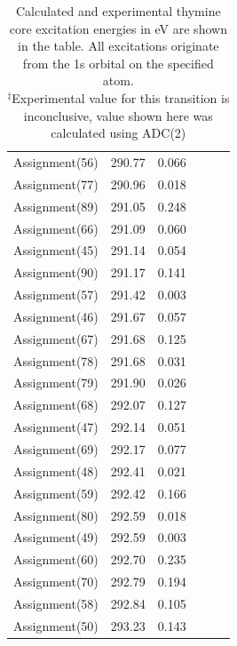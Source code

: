\documentclass[11.5pt]{article}
\begin{document}
\begin{table}
\begin{tabular}{c@{\hskip 0.22in}c@{\hskip 0.22in}c@{\hskip 0.52in}c@{\hskip 0.22in}c@{\hskip 0.22in}c}
 Assignment(56) & 290.77 & 0.066 \\
 Assignment(77) & 290.96 & 0.018 \\
 Assignment(89) & 291.05 & 0.248 \\
 Assignment(66) & 291.09 & 0.060 \\
 Assignment(45) & 291.14 & 0.054 \\
 Assignment(90) & 291.17 & 0.141 \\
 Assignment(57) & 291.42 & 0.003 \\
 Assignment(46) & 291.67 & 0.057 \\
 Assignment(67) & 291.68 & 0.125 \\
 Assignment(78) & 291.68 & 0.031 \\
 Assignment(79) & 291.90 & 0.026 \\
 Assignment(68) & 292.07 & 0.127 \\
 Assignment(47) & 292.14 & 0.051 \\
 Assignment(69) & 292.17 & 0.077 \\
 Assignment(48) & 292.41 & 0.021 \\
 Assignment(59) & 292.42 & 0.166 \\
 Assignment(80) & 292.59 & 0.018 \\
 Assignment(49) & 292.59 & 0.003 \\
 Assignment(60) & 292.70 & 0.235 \\
 Assignment(70) & 292.79 & 0.194 \\
 Assignment(58) & 292.84 & 0.105 \\
 Assignment(50) & 293.23 & 0.143 \\
     \end{tabular}
      \caption{Calculated and experimental thymine core excitation energies in eV are shown in the table. All excitations originate from the 1s orbital on the specified atom. \\
  $^{\ddagger}$Experimental value for this transition is inconclusive, value shown here was calculated using ADC(2)}
  \label{figure:MOs}
  \end{table}
\end{document}
